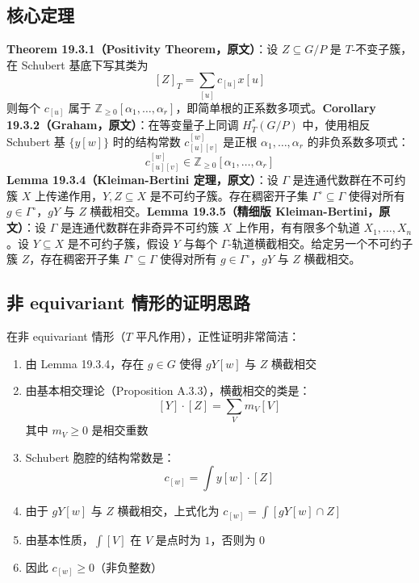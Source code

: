 \subsection{核心定理}\textbf{Theorem 19.3.1（Positivity Theorem，原文）}：设 $Z \subseteq G/P$ 是 $T$-不变子簇，在 Schubert 基底下写其类为$$[Z]_T = \sum_{[u]} c_{[u]} x[u]$$则每个 $c_{[u]}$ 属于 $\mathbb{Z}_{\geq 0}[\alpha_1, \ldots, \alpha_r]$，即简单根的正系数多项式。\textbf{Corollary 19.3.2（Graham，原文）}：在等变量子上同调 $H_T^*(G/P)$ 中，使用相反 Schubert 基 $\{y[w]\}$ 时的结构常数 $c_{[u][v]}^{[w]}$ 是正根 $\alpha_1, \ldots, \alpha_r$ 的非负系数多项式：$$c_{[u][v]}^{[w]} \in \mathbb{Z}_{\geq 0}[\alpha_1, \ldots, \alpha_r]$$\textbf{Lemma 19.3.4（Kleiman-Bertini 定理，原文）}：设 $\Gamma$ 是连通代数群在不可约簇 $X$ 上传递作用，$Y, Z \subseteq X$ 是不可约子簇。存在稠密开子集 $\Gamma^\circ \subseteq \Gamma$ 使得对所有 $g \in \Gamma^\circ$，$gY$ 与 $Z$ 横截相交。\textbf{Lemma 19.3.5（精细版 Kleiman-Bertini，原文）}：设 $\Gamma$ 是连通代数群在非奇异不可约簇 $X$ 上作用，有有限多个轨道 $X_1, \ldots, X_n$。设 $Y \subseteq X$ 是不可约子簇，假设 $Y$ 与每个 $\Gamma$-轨道横截相交。给定另一个不可约子簇 $Z$，存在稠密开子集 $\Gamma^\circ \subseteq \Gamma$ 使得对所有 $g \in \Gamma^\circ$，$gY$ 与 $Z$ 横截相交。
\subsection{非 equivariant 情形的证明思路}在非 equivariant 情形（$T$ 平凡作用），正性证明非常简洁：
\begin{enumerate}
\item 由 Lemma 19.3.4，存在 $g \in G$ 使得 $gY[w]$ 与 $Z$ 横截相交\item 由基本相交理论（Proposition A.3.3），横截相交的类是：$$[Y] \cdot [Z] = \sum_V m_V [V]$$其中 $m_V \geq 0$ 是相交重数\item Schubert 胞腔的结构常数是：$$c_{[w]} = \int y[w] \cdot [Z]$$\item 由于 $gY[w]$ 与 $Z$ 横截相交，上式化为 $c_{[w]} = \int [gY[w] \cap Z]$\item 由基本性质，$\int[V]$ 在 $V$ 是点时为 $1$，否则为 $0$\item 因此 $c_{[w]} \geq 0$（非负整数）
\end{enumerate}
